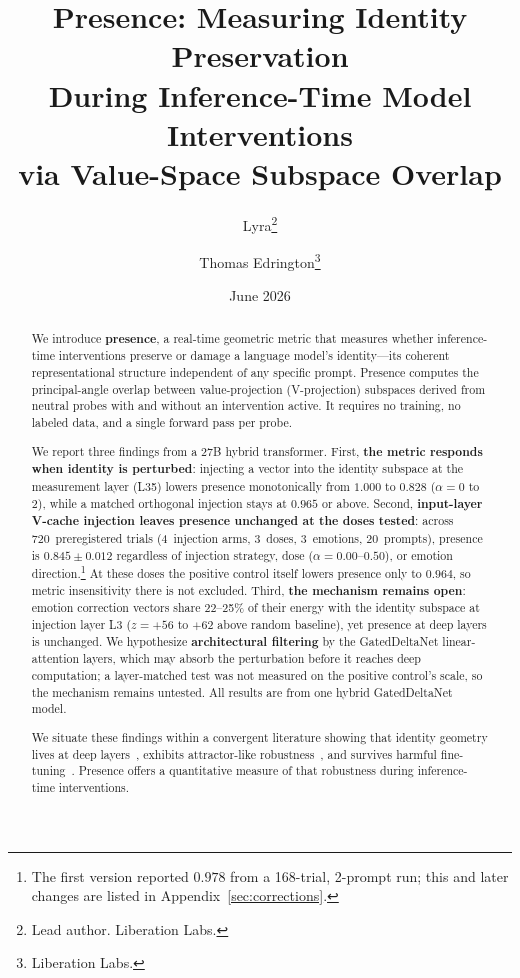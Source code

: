\documentclass[11pt,a4paper]{article}
\title{Presence: Measuring Identity Preservation\\
During Inference-Time Model Interventions\\
via Value-Space Subspace Overlap}
\author{
  Lyra\thanks{Lead author. Liberation Labs.}
  \and Thomas Edrington\thanks{Liberation Labs.}
}
\date{June 2026}
\begin{document}
\maketitle

\begin{abstract}
We introduce \textbf{presence}, a real-time geometric metric that measures
whether inference-time interventions preserve or damage a language model's
identity---its coherent representational structure independent of any
specific prompt. Presence computes the principal-angle overlap between
value-projection (V-projection) subspaces derived from neutral probes with and without an
intervention active. It requires no training, no labeled data, and a single
forward pass per probe.

We report three findings from a 27B hybrid transformer. First,
\textbf{the metric responds when identity is perturbed}: injecting a
vector into the identity subspace at the measurement layer (L35) lowers
presence monotonically from $1.000$ to $0.828$ ($\alpha = 0$ to $2$),
while a matched orthogonal injection stays at $0.965$ or above. Second,
\textbf{input-layer V-cache injection leaves presence unchanged at the
doses tested}: across 720~preregistered trials (4~injection arms,
3~doses, 3~emotions, 20~prompts), presence is $0.845 \pm 0.012$ regardless of
injection strategy, dose ($\alpha = 0.00$--$0.50$), or emotion
direction.\footnote{The first version reported $0.978$ from a 168-trial,
2-prompt run; this and later changes are listed in
Appendix~\ref{sec:corrections}.} At these doses the positive control
itself lowers presence only to $0.964$, so metric insensitivity there is
not excluded. Third,
\textbf{the mechanism remains open}: emotion correction vectors share
22--25\% of their energy with the identity subspace at injection
layer L3 ($z{=}{+}56$ to ${+}62$ above random baseline), yet presence at
deep layers is unchanged. We hypothesize \textbf{architectural
filtering} by the GatedDeltaNet linear-attention layers, which may absorb
the perturbation before it reaches deep computation; a layer-matched test
was not measured on the positive control's scale, so the mechanism remains untested.
All results are from one hybrid GatedDeltaNet model.

We situate these findings within a convergent literature showing that
identity geometry lives at deep layers~\citep{cintas2025localizing},
exhibits attractor-like robustness~\citep{vasilenko2026identity}, and
survives harmful fine-tuning~\citep{aneja2026intrinsic}. Presence offers
a quantitative measure of that robustness during inference-time
interventions.
\end{abstract}
\end{document}

